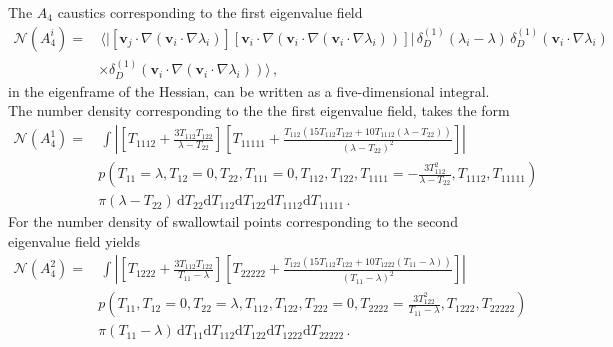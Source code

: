 \documentclass[a4paper, 11pt]{article}
\begin{document}
The $A_4$ caustics corresponding to the first eigenvalue field
\begin{align}
\mathcal{N}(A_4^{i}) 
=&\, \bigg \langle \big| \left[\bm{v}_j \cdot \nabla (\bm{v}_i \cdot \nabla \lambda_i)\right]\left[ \bm{v}_i \cdot \nabla (\bm{v}_i \cdot \nabla(\bm{v}_i \cdot \nabla \lambda_i))\right]\big|\,
 \delta_D^{(1)}(\lambda_i - \lambda) \,
 \delta_D^{(1)}(\bm{v}_i \cdot \nabla \lambda_i) \nonumber\\
&\times \delta_D^{(1)}(\bm{v}_i \cdot \nabla(\bm{v}_i \cdot \nabla \lambda_i)) \bigg \rangle\,,
\end{align}
in the eigenframe of the Hessian, can be written as a five-dimensional integral. The number density corresponding to the the first eigenvalue field, takes the form
\begin{align}
\mathcal{N}(A_4^{1}) 
=&\, \int \left| 
\left[T_{1112}+\frac{3T_{112}T_{122}}{\lambda-T_{22}}\right]
\left[T_{11111}+\frac{T_{112}( 15 T_{112}T_{122} + 10 T_{1112}(\lambda-T_{22}))}{(\lambda-T_{22})^2}\right]\right|\nonumber\\
&p(T_{11}=\lambda,T_{12} = 0, T_{22},T_{111}=0,T_{112},T_{122},T_{1111} = -\frac{3 T_{112}^2}{\lambda-T_{22}},T_{1112},T_{11111})\nonumber\\
&\pi(\lambda-T_{22})\,\mathrm{d}T_{22} \mathrm{d}T_{112}\mathrm{d}T_{122}\mathrm{d}T_{1112}\mathrm{d}T_{11111}\,.
\end{align}
For the number density of swallowtail points corresponding to the second eigenvalue field yields
\begin{align}
\mathcal{N}(A_4^{2}) 
=&\, \int \left| 
\left[T_{1222}+\frac{3T_{112}T_{122}}{T_{11}-\lambda}\right]
\left[T_{22222}+\frac{T_{122}( 15 T_{112}T_{122} + 10 T_{1222}(T_{11}-\lambda))}{(T_{11}-\lambda)^2}\right]\right|\nonumber\\
&p(T_{11},T_{12} = 0, T_{22}=\lambda,T_{112},T_{122},T_{222}=0,T_{2222} = \frac{3 T_{122}^2}{T_{11}-\lambda},T_{1222},T_{22222})\nonumber\\
&\pi(T_{11}-\lambda)\,\mathrm{d}T_{11} \mathrm{d}T_{112}\mathrm{d}T_{122}\mathrm{d}T_{1222}\mathrm{d}T_{22222}\,.
\end{align}
\end{document}
